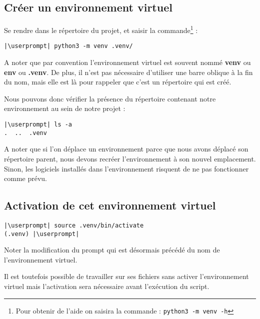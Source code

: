 \subsection*{Créer un environnement virtuel}
Se rendre dans le répertoire du projet, et saisir la commande\footnote{Pour obtenir de l'aide on saisira la commande : \texttt{python3 -m venv -h}} :
\begin{lstlisting}[style=bash]
|\userprompt| python3 -m venv .venv/
\end{lstlisting}

A noter que par convention l'environnement virtuel est souvent nommé \textbf{venv} ou \textbf{env} ou \textbf{.venv}. De plus, il n'est pas nécessaire d'utiliser une barre oblique à la fin du nom, mais elle est là pour rappeler que c'est un répertoire qui est créé.

Nous pouvons donc vérifier la présence du répertoire contenant notre environnement au sein de notre projet :
\begin{lstlisting}[style=bash]
|\userprompt| ls -a
.  ..  .venv
\end{lstlisting}

A noter que si l'on déplace un environnement parce que nous avons déplacé son répertoire parent, nous devons recréer l'environnement à son nouvel emplacement. Sinon, les logiciels installés dans l'environnement risquent de ne pas fonctionner comme prévu.

\subsection*{Activation de cet environnement virtuel}
\begin{lstlisting}[style=bash]
|\userprompt| source .venv/bin/activate
(.venv) |\userprompt|
\end{lstlisting}

Noter la modification du prompt qui est désormais précédé du nom de l'environnement virtuel.

Il est toutefois possible de travailler sur ses fichiers sans activer l'environnement virtuel mais l'activation sera nécessaire avant l'exécution du script.

